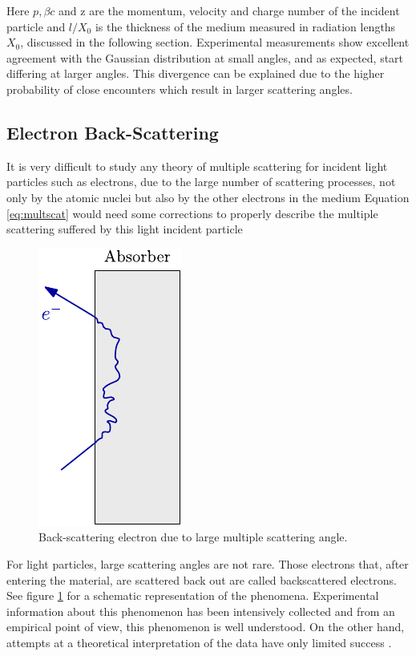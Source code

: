 Here $p,\beta c $ and z are the momentum, velocity and charge number of the incident particle and $l/X_0$ is the thickness of the medium measured in radiation lengths $X_0$, discussed in the following section. Experimental measurements show excellent agreement with the Gaussian distribution at small angles, and as expected, start differing at larger angles. This divergence can be explained due to the higher probability of close encounters which result in larger scattering angles. 

\subsection{Electron Back-Scattering}
\label{sec:BS}
It is very difficult to study any theory of multiple scattering for incident light particles such as electrons, due to the large number of scattering processes, not only by the atomic nuclei but also by the other electrons in the medium \parencite*[][]{ref:MultipleElec1} Equation \ref{eq:multscat} would need some corrections to properly describe the multiple scattering suffered by this light incident particle \parencite*[][]{ref:MultipleElec2}

\begin{figure}[h]
    \centering
    \includegraphics[width=0.25\columnwidth]{ElectronBS/ElectronBS.pdf}
    \caption{Back-scattering electron due to large multiple scattering angle.}
    \label{fig:backscatt}
\end{figure}

For light particles, large scattering angles are not rare. Those electrons that, after entering the material, are scattered back out are called backscattered electrons. See figure \ref{fig:backscatt} for a schematic representation of the phenomena.  Experimental information about this phenomenon has been intensively collected and from an empirical point of view, this phenomenon is well understood. On the other hand, attempts at a theoretical interpretation of the data have only limited success \parencite[][]{ref:BackScatTheo}.

